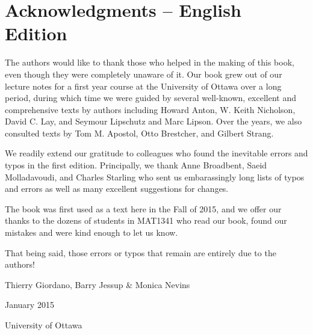 \chapter*{Acknowledgments -- English Edition}

The authors would like to thank those who helped in the making of this book, even though they were completely unaware of it. Our book grew out of our lecture notes for a first year course at the University of Ottawa over a long period, during which time we were guided by  several well-known, excellent and comprehensive texts by authors including Howard Anton, W. Keith Nicholson, David C. Lay, and Seymour Lipschutz and Marc Lipson. Over the years, we also consulted texts by Tom M. Apostol, Otto Brestcher, and Gilbert Strang.



We readily extend our gratitude to colleagues who found the inevitable errors and typos in the first edition. Principally, we thank Anne Broadbent, Saeid Molladavoudi, and Charles Starling who sent us embarassingly long lists of typos and errors as well as many excellent suggestions for changes. 

The book was first used as a text here in the Fall of 2015, and we offer our thanks to the dozens of students in MAT1341 who read our book, found our mistakes and were kind enough to let us know.

That being said, those errors or typos that remain are entirely due to the authors!



\vspace{1in}

{\flushright

Thierry Giordano, Barry Jessup \& Monica Nevins 



January 2015




University of Ottawa

}

